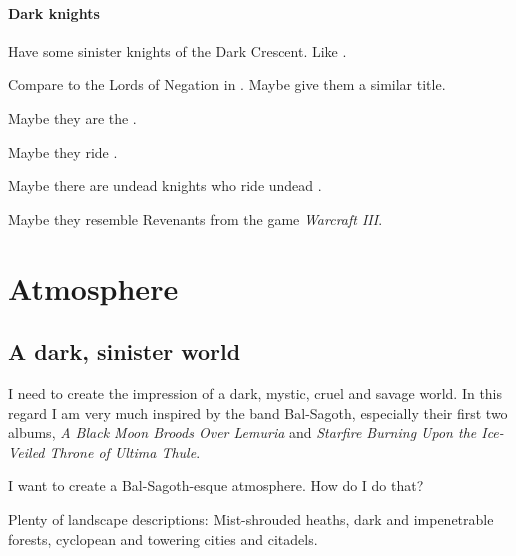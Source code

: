\subsubsection{Dark knights}
Have some sinister knights of the Dark Crescent. Like . 

Compare to the Lords of Negation in \FLuneNoire. Maybe give them a similar title. 

Maybe they are the . 

Maybe they ride .

Maybe there are undead knights who ride undead \vreiiden.

Maybe they resemble Revenants from the game \emph{Warcraft III}. 







































\chapter{Atmosphere}
\section{A dark, sinister world}
I need to create the impression of a dark, mystic, cruel and savage world. In this regard I am very much inspired by the band Bal-Sagoth, especially their first two albums, \emph{A Black Moon Broods Over Lemuria} and \emph{Starfire Burning Upon the Ice-Veiled Throne of Ultima Thule}. 

I want to create a Bal-Sagoth-esque atmosphere. How do I do that? 

Plenty of landscape descriptions: 
Mist-shrouded heaths, dark and impenetrable forests, cyclopean and towering cities and citadels. 

